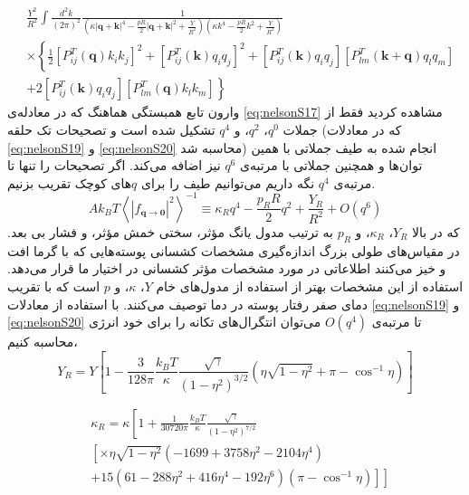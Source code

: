 \begin{equation}
\begin{aligned}
&\frac{Y^2}{R^2} \int\frac{d^2k}{(2\pi)^2} \frac{1}{ 
\left( \kappa|\boldsymbol q + \boldsymbol k|^4 - \frac{pR}{2} |\boldsymbol q + \boldsymbol k|^2 + \frac{Y}{R^2} \right)
\left( \kappa k^4 - \frac{pR}{2}k^2 + \frac{Y}{R^2} \right) 
} \\
&\times\left\{ 
\frac{1}{2} \left[ P_{ij}^T(\boldsymbol q)k_ik_j\right]^2 + 
\left[P_{ij}^T(\boldsymbol k)q_iq_j\right]^2 + 
\left[P_{ij}^T(\boldsymbol k)q_iq_j\right] 
\left[P_{lm}^T(\boldsymbol{k+ q})q_lq_m\right] \right.\\
& \left.+ 2\left[P_{ij}^T(\boldsymbol k)q_iq_j\right]
\left[P_{lm}^T(\boldsymbol{q})k_lk_m\right]
\right\}
\label{eq:nelsonS20}
\end{aligned}
\end{equation}
وارون تابع همبستگی هماهنگ که در معادله‌ی \ref{eq:nelsonS17} مشاهده کردید فقط از جملات $q^0$، $q^2$، و $q^4$ تشکیل شده است و تصحیحات تک حلقه (که در معادلات \ref{eq:nelsonS19} و \ref{eq:nelsonS20} محاسبه شد) انجام شده به طیف جملاتی با همین توان‌ها و همچنین جملاتی با مرتبه‌ی $q^6$ نیز اضافه می‌کند. اگر  تصحیحات را تنها تا مرتبه‌ی $q^4$ نگه داریم می‌توانیم طیف را برای $q$های
کوچک تقریب بزنیم. 
\begin{equation}
Ak_BT\left\langle|f_{\boldsymbol q\rightarrow \boldsymbol 0}|^2\right\rangle^{-1} \equiv\kappa_Rq^4-\frac{p_RR}{2}q^2+\frac{Y_R}{R^2}+O(q^6)
\label{eq:nelsonS21}
\end{equation}
 که در بالا $Y_R$، $\kappa_R$، و $p_R$ به ترتیب مدول یانگ مؤثر، سختی خمش مؤثر، و فشار بی بعد. در مقیاس‌های طولی بزرگ اندازه‌گیری مشخصات کشسانی پوسته‌هایی که با گرما افت و خیز می‌کنند اطلاعاتی در مورد مشخصات مؤثر کشسانی در اختیار ما قرار می‌دهد. استفاده از این مشخصات بهتر از استفاده از مدول‌های خام $Y$، $\kappa$، و $p$
است که با تقریب دمای صفر رفتار پوسته در دما توصیف می‌کنند. با استفاده از معادلات \ref{eq:nelsonS19} و \ref{eq:nelsonS20} 
تا مرتبه‌ی $O(q^4)$
می‌توان انتگرال‌های تکانه را برای خود انرژی محاسبه کنیم،
\begin{equation}
Y_R=Y\left[1-\frac{3}{128\pi}\frac{k_BT}{\kappa}\frac{\sqrt\gamma}{(1-\eta^2)^{3/2}}\left(\eta\sqrt{1-\eta^2}+\pi-\cos^{-1}\eta\right)\right]
\label{eq:nelsonS22}
\end{equation}

\begin{equation}
\begin{aligned}
&\kappa_R=\kappa\left[1+\frac{1}{30720\pi}\frac{k_BT}{\kappa}\frac{\sqrt\gamma}{(1-\eta^2)^{7/2}}\right.\\
&\left.\left[\times\eta\sqrt{1-\eta^2}(-1699+3758\eta^2-2104\eta^4) \right.\right.\\
& \left.\left. +15(61-288\eta^2+416\eta^4-192\eta^6)(\pi-\cos^{-1}\eta)\right]\right]
\label{eq:nelsonS23}
\end{aligned}
\end{equation}

